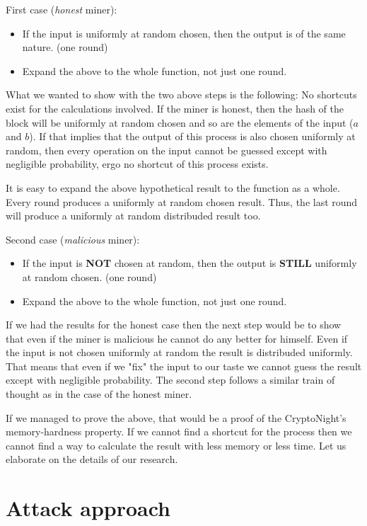 First case (\emph{honest} miner):
\begin{itemize}
  \item If the input is uniformly at random chosen, then the output is of the same nature. (one round)
  \item Expand the above to the whole function, not just one round.
\end{itemize}

What we wanted to show with the two above steps is the following: No shortcuts exist for the calculations involved. If the miner is honest, then the hash of the block will be uniformly at random chosen and so are the elements of the input ($a$ and $b$). If that implies that the output of this process is also chosen uniformly at random, then every operation on the input cannot be guessed except with negligible probability, ergo no shortcut of this process exists.

It is easy to expand the above hypothetical result to the function as a whole. Every round produces a uniformly at random chosen result. Thus, the last round will produce a uniformly at random distribuded result too.

Second case (\emph{malicious} miner):
\begin{itemize}
  \item If the input is \textbf{NOT} chosen at random, then the output is \textbf{STILL} uniformly at random chosen. (one round)
  \item Expand the above to the whole function, not just one round.
\end{itemize}

If we had the results for the honest case then the next step would be to show that even if the miner is malicious he cannot do any better for himself. Even if the input is not chosen uniformly at random the result is distribuded uniformly. That means that even if we "fix" the input to our taste we cannot guess the result except with negligible probability. The second step follows a similar train of thought as in the case of the honest miner.

If we managed to prove the above, that would be a proof of the CryptoNight's memory-hardness property. If we cannot find a shortcut for the process then we cannot find a way to calculate the result with less memory or less time. Let us elaborate on the details of our research.

\section{Attack approach}
